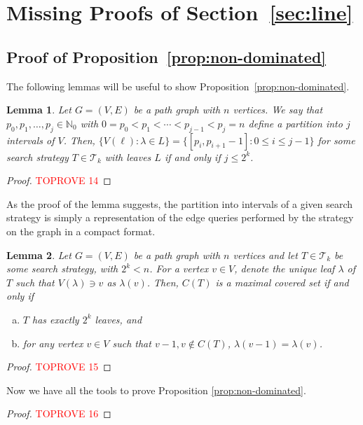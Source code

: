 \documentclass[11pt]{article}
\newtheorem{lemma}{Lemma}[section]
\newcommand{\N}{\mathbb{N}}
\newcommand{\BSTs}{\mathcal{T}}
\newcommand\+{\mkern2mu}
\begin{document}
\appendix

\section{Missing Proofs of Section~\ref{sec:line}}

\subsection{Proof of Proposition~\ref{prop:non-dominated}}

The following lemmas will be useful to show Proposition~\ref{prop:non-dominated}.

\begin{lemma}\label{lm:leaves}
    Let $G=(V, E)$ be a path graph with $n$ vertices. We say that $p_0, p_1, \ldots, p_{j} \in \N_0$ with $0 = p_0  < p_1 < \cdots < p_{j-1} < p_{j} = n$ define a \emph{partition into $j$ intervals} of $V$. Then, $\{V(\ell): \lambda \in L\} = \{[p_i, p_{i+1}-1]: 0 \leq i \leq j-1\}$ for some search strategy $T \in \BSTs_k$ with leaves $L$ if and only if $j \leq 2^k$.
\end{lemma}
\begin{proof}\textcolor{red}{TOPROVE 14}\end{proof}

As the proof of the lemma suggests, the partition into intervals of a given search strategy is simply a representation of the edge queries performed by the strategy on the graph in a compact format. 

\begin{lemma}\label{lm:non-dominated}
    Let $G=(V, E)$ be a path graph with $n$ vertices and let $T \in \BSTs_k$ be some search strategy, with $2^k < n$. For a vertex $v \in V$, denote the unique leaf $\lambda$ of $T$ such that $V(\lambda) \ni v$ as $\lambda(v)$. Then, $C(T)$ is a maximal covered set if and only if 
    \begin{enumerate}[a)]
        \item $T$ has exactly $2^k$ leaves, and
        \item for any vertex $v \in V$ such that $v-1, v \not \in C(T)$, $\lambda(v-1) = \lambda(v)$.
    \end{enumerate}
\end{lemma}
\begin{proof}\textcolor{red}{TOPROVE 15}\end{proof}

Now we have all the tools to prove Proposition \ref{prop:non-dominated}.
\begin{proof}\textcolor{red}{TOPROVE 16}\end{proof}
\end{document}
